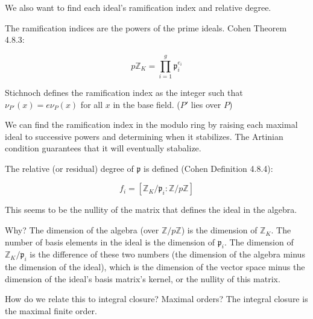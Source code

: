 We also want to find each ideal's ramification index and relative degree.

The ramification indices are the powers of the prime ideals.  Cohen Theorem 4.8.3:

$$p {\mathbb Z}_K = \prod_{i=1}^{g} {\mathfrak p}_i^{e_i}$$

Stichnoch defines the ramification index as the integer such
that $\nu_{P'}(x) = e \nu_P(x)$ for all $x$ in the base field.
($P'$ lies over $P$)

We can find the ramification index in the modulo ring by raising each maximal
ideal to successive powers and determining when it stabilizes.  The Artinian
condition guarantees that it will eventually stabalize.

The relative (or residual) degree of ${\mathfrak p}$ is defined (Cohen Definition 4.8.4):

$$f_i = [{\mathbb Z}_K/{\mathfrak p}_i : {\mathbb Z}/p{\mathbb Z}]$$

This seems to be the nullity of the matrix that defines the ideal in the algebra.

Why?  The dimension of the algebra (over ${\mathbb Z}/p{\mathbb Z}$)
is the dimension of ${\mathbb Z}_K$.  The number of basis elements in
the ideal is the dimension of ${\mathfrak p}_i$.  The dimension of
${\mathbb Z}_K/{\mathfrak p}_i$ is the difference of these two numbers
(the dimension of the algebra minus the dimension of the ideal), which
is the dimension of the vector space minus the dimension of the
ideal's basis matrix's kernel, or the nullity of this matrix.

How do we relate this to integral closure?  Maximal orders?  The integral closure is the maximal finite order.


%
%
%
%
%
%
%

